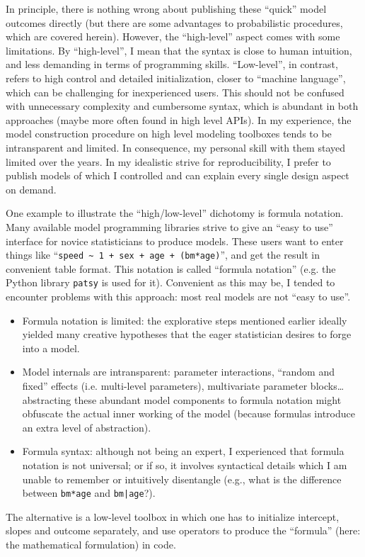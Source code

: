 In principle, there is nothing wrong about publishing these ``quick'' model outcomes directly (but there are some advantages to probabilistic procedures, which are covered herein).
However, the ``high-level'' aspect comes with some limitations.
By ``high-level'', I mean that the syntax is close to human intuition, and less demanding in terms of programming skills.
``Low-level'', in contrast, refers to high control and detailed initialization, closer to ``machine language'', which can be challenging for inexperienced users.
This should not be confused with unnecessary complexity and cumbersome syntax, which is abundant in both approaches (maybe more often found in high level APIs).
In my experience, the model construction procedure on high level modeling toolboxes tends to be intransparent and limited.
In consequence, my personal skill with them stayed limited over the years.
In my idealistic strive for reproducibility, I prefer to publish models of which I controlled and can explain every single design aspect on demand.

One example to illustrate the ``high/low-level'' dichotomy is formula notation.
Many available model programming libraries strive to give an ``easy to use'' interface for novice statisticians to produce models.
These users want to enter things like ``\texttt{speed \textasciitilde{} 1 + sex + age + (bm*age)}'', and get the result in convenient table format.
This notation is called ``formula notation'' (e.g. the Python library \texttt{patsy} is used for it).
Convenient as this may be, I tended to encounter problems with this approach: most real models are not ``easy to use''.
\begin{itemize}
\item Formula notation is limited: the explorative steps mentioned earlier ideally yielded many creative hypotheses that the eager statistician desires to forge into a model.
\item Model internals are intransparent: parameter interactions, ``random and fixed'' effects (i.e. multi-level parameters), multivariate parameter blocks\ldots{} abstracting these abundant model components to formula notation might obfuscate the actual inner working of the model (because formulas introduce an extra level of abstraction).
\item Formula syntax: although not being an expert, I experienced that formula notation is not universal; or if so, it involves syntactical details which I am unable to remember or intuitively disentangle (e.g., what is the difference between \texttt{bm*age} and \texttt{bm|age}?).
\end{itemize}
The alternative is a low-level toolbox in which one has to initialize intercept, slopes and outcome separately, and use operators to produce the ``formula'' (here: the mathematical formulation) in code.

